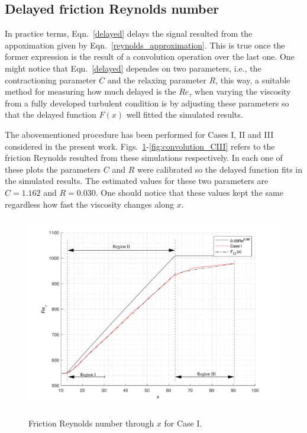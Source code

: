 \documentclass[twocolumn,10pt]{asme2e}
\begin{document}
\subsection*{Delayed friction Reynolds number}

In practice terms, Eqn.~\ref{delayed} delays the signal resulted from the appoximation given by Eqn.~\ref{reynolds_approximation}. This is true once the former expression is the result of a convolution operation over the last one. One might notice that Eqn.~\ref{delayed} dependes on two parameters, i.e., the contractioning parameter \(C\) and the relaxing parameter \(R\), this way, a suitable method for measuring how much delayed is the \(Re_{\tau}\) when varying the viscosity from a fully developed turbulent condition is by adjusting these parameters so that the delayed function \(F(x)\) well fitted the simulated results.

The abovementioned procedure has been performed for Cases I, II and III considered in the present work. Figs.~\ref{fig:convolution_CI}-\ref{fig:convolution_CIII} refers to the friction Reynolds resulted from these simulations respectively. In each one of these plots the parameters \(C\) and \(R\) were calibrated so the delayed function fits in the simulated results. The estimated values for these two parameters are \(C=1.162\) and \(R=0.030\). One should notice that these values kept the same regardless how fast the viscosity changes along \(x\).

\begin{figure}[t]
\centering
\scalebox{0.4}
{\includegraphics{convolution_CI.pdf}}
\caption{Friction Reynolds number through \(x\) for Case I.}
\label{fig:convolution_CI}
\end{figure}
\end{document}
